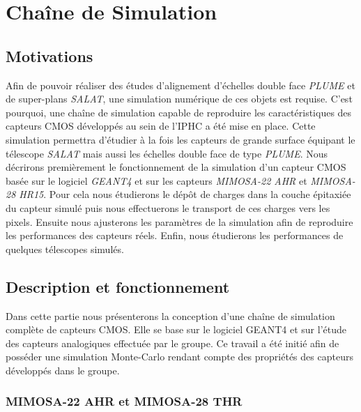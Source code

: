 \chapter{Chaîne de Simulation}
\label{chapter4}

\section{Motivations}

Afin de pouvoir r\'ealiser des \'etudes d'alignement d'\'echelles double face \textit{PLUME} et de super-plans \textit{SALAT}, une simulation num\'erique de ces objets est requise. C'est pourquoi, une cha\^ine de simulation capable de reproduire les caract\'eristiques des capteurs CMOS d\'evelopp\'es au sein de l'IPHC a \'et\'e mise en place. Cette simulation permettra d'étudier \`a la fois les capteurs de grande surface \'equipant le t\'elescope \textit{SALAT} mais aussi les \'echelles double face de type \textit{PLUME}. Nous d\'ecrirons premi\`erement le fonctionnement de la simulation d'un capteur CMOS bas\'ee sur le logiciel \textit{GEANT4} et sur les capteurs \textit{MIMOSA-22 AHR} et \textit{MIMOSA-28 HR15}. Pour cela nous \'etudierons le d\'ep\^ot de charges dans la couche épitaxiée du capteur simul\'e puis nous effectuerons le transport de ces charges vers les pixels. Ensuite nous ajusterons les param\`etres de la simulation afin de reproduire les performances des capteurs r\'eels. Enfin, nous \'etudierons les performances de quelques t\'elescopes simul\'es.

\section{Description et fonctionnement}

  Dans cette partie nous pr\'esenterons la conception d'une chaîne de simulation compl\`ete de capteurs CMOS. Elle se base sur le logiciel GEANT4 et sur l'\'etude des capteurs analogiques effectu\'ee par le groupe. Ce travail a \'et\'e initi\'e afin de posséder une simulation Monte-Carlo rendant compte des propri\'et\'es des capteurs d\'evelopp\'es dans le groupe.

  \subsection{MIMOSA-22 AHR et MIMOSA-28 THR}
  
